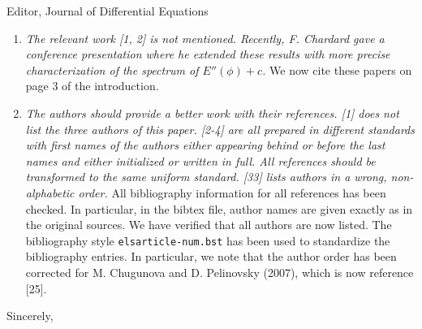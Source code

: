 \documentclass[11pt]{letter}
\begin{document}
\begin{letter}{Editor, Journal of Differential Equations}
\begin{enumerate}
    \item \emph{The relevant work [1, 2] is not mentioned. Recently, F. Chardard gave a conference presentation where he extended these results with more precise characterization of the spectrum of $E''(\phi) + c$.} We now cite these papers on page 3 of the introduction.
    \vspace{4mm}

    \item \emph{The authors should provide a better work with their references. [1] does not list the three authors of this paper. [2-4] are all prepared in different standards with first names of the authors either appearing behind or before the last names and either initialized or written in full. All references should be transformed to the same uniform standard. [33] lists authors in a wrong, non-alphabetic order.} All bibliography information for all references has been checked. In particular, in the bibtex file, author names are given exactly as in the original sources. We have verified that all authors are now listed. The bibliography style \texttt{elsarticle-num.bst} has been used to standardize the bibliography entries. In particular, we note that the author order has been corrected for M. Chugunova and D. Pelinovsky (2007), which is now reference [25].
\end{enumerate}



\closing{Sincerely,}

\end{letter}
\end{document}
